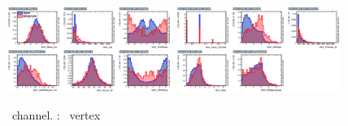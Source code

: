 \begin{figure}[htbp]
	\includegraphics[width=0.48\textwidth]{6_Search/Figures/MVAtechnics/toppairzut/uuu/variables_id_c1.png}
	\includegraphics[width=0.48\textwidth]{6_Search/Figures/MVAtechnics/toppairzut/uuu/variables_id_c2.png}
	\caption{\mumumu\ channel. \TTSR: \Zut\ vertex }
	\label{image:Figuresuuutoppairzut}
\end{figure}

